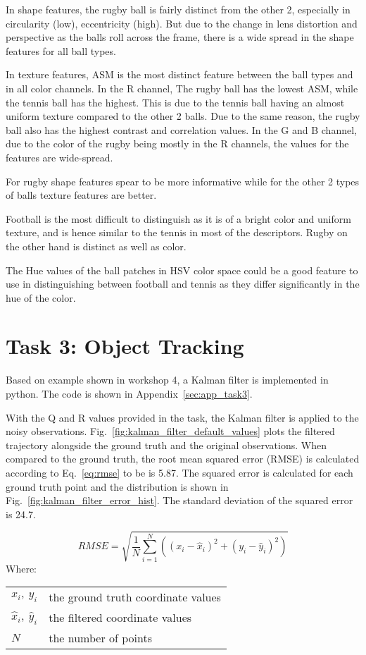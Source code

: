 \documentclass{report}
\makeatletter
\newenvironment{conditions}
  {\par\vspace{\abovedisplayskip}\noindent\begin{tabular}{>{$}l<{$} @{${}={}$} l}}
  {\end{tabular}\par\vspace{\belowdisplayskip}}
\makeatother
\begin{document}
In shape features, the rugby ball is fairly distinct from the other 2, especially in circularity (low), eccentricity (high). But due to the change in lens distortion and perspective as the balls roll across the frame, there is a wide spread in the shape features for all ball types.

In texture features, ASM is the most distinct feature between the ball types and in all color channels. In the R channel, The rugby ball has the lowest ASM, while the tennis ball has the highest. This is due to the tennis ball having an almost uniform texture compared to the other 2 balls. Due to the same reason, the rugby ball also has the highest contrast and correlation values. In the G and B channel, due to the color of the rugby being mostly in the R channels, the values for the features are wide-spread.

For rugby shape features spear to be more informative while for the other 2 types of balls texture features are better.

Football is the most difficult to distinguish as it is of a bright color and uniform texture, and is hence similar to the tennis in most of the descriptors. Rugby on the other hand is distinct as well as color.

The Hue values of the ball patches in HSV color space could be a good feature to use in distinguishing between football and tennis as they differ significantly in the hue of the color.

\chapter{Task 3: Object Tracking}

Based on example shown in workshop 4, a Kalman filter is implemented in python. The code is shown in Appendix~\ref{sec:app_task3}.

With the Q and R values provided in the task, the Kalman filter is applied to the noisy observations. Fig.~\ref{fig:kalman_filter_default_values} plots the filtered trajectory alongside the ground truth and the original observations. When compared to the ground truth, the root mean squared error (RMSE) is calculated according to Eq.~\ref{eq:rmse} to be is 5.87. The squared error is calculated for each ground truth point and the distribution is shown in Fig.~\ref{fig:kalman_filter_error_hist}. The standard deviation of the squared error is 24.7.

\begin{equation}
    RMSE = \sqrt{\frac{1}{N} \sum_{i=1}^{N} ((x_{i} - \hat{x}_{i})^2 + (y_{i} - \hat{y}_{i})^2)}
    \label{eq:rmse}
\end{equation}
Where:
\begin{conditions}
 x_{i},\ y_{i}             & the ground truth coordinate values \\
 \hat{x}_{i},\ \hat{y}_{i} & the filtered coordinate values \\
 N                       & the number of points
\end{conditions}
\end{document}
